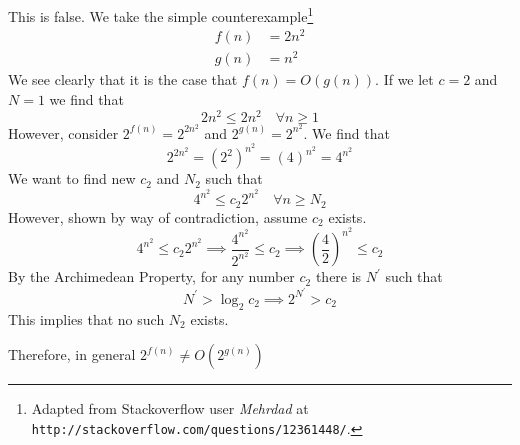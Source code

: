 \documentclass[12pt]{article}
\begin{document}
\begin{enumerate}
\begin{enumerate}
    This is false. We take the simple counterexample\footnote{Adapted from Stackoverflow user \textit{Mehrdad} at \texttt{http://stackoverflow.com/questions/12361448/}.}
    \begin{align*}
    f(n) &= 2n^2\\
    g(n) &= n^2
    \end{align*}
    We see clearly that it is the case that $f(n) = O(g(n))$. If we let $c=2$ and $N=1$ we find that 
    \[
    2n^2 \leq 2n^2 \hspace{12pt} \forall n\geq 1
    \]
    However, consider $2^{f(n)} = 2^{2n^2}$ and $2^{g(n)} = 2^{n^2}$. We find that 
    \[
    2^{2n^2} = \left(2^2\right)^{n^2} = (4)^{n^2} = 4^{n^2}
    \]
    We want to find new $c_2$ and $N_2$ such that 
    \[
    4^{n^2} \leq c_2 2^{n^2} \hspace{12pt} \forall n\geq N_2
    \]
    However, shown by way of contradiction, assume $c_2$ exists.
    \[
    4^{n^2} \leq c_2 2^{n^2} \implies \frac{4^{n^2}}{2^{n^2}}\leq c_2 \implies \left(\frac{4}{2}\right)^{n^2} \leq c_2
    \]
    By the Archimedean Property, for any number $c_2$ there is $N^\prime$ such that
    \[
    N^\prime > \log_2 c_2 \implies 2^{N^\prime} > c_2
    \]
    This implies that no such $N_2$ exists. 
    
  	Therefore, in general $\boxed{2^{f(n)} \neq O(2^{g(n)})}$\\
    

\end{enumerate}
\end{enumerate}
\end{document}
